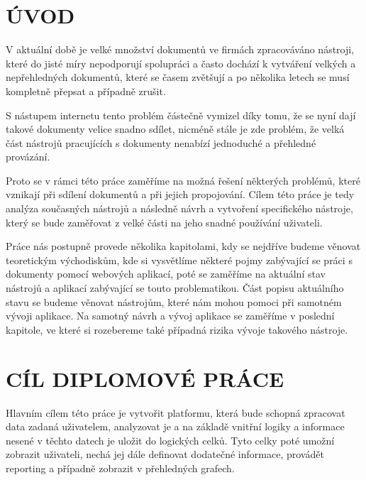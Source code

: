 \chapter*{ÚVOD}
\par V aktuální době je velké množství dokumentů ve firmách zpracováváno nástroji, které do jisté míry nepodporují spolupráci a často dochází k vytváření velkých a nepřehledných dokumentů, které se časem zvětšují a po několika letech se musí kompletně přepsat a případně zrušit.

\par S nástupem internetu tento problém částečně vymizel díky tomu, že se nyní dají takové dokumenty velice snadno sdílet, nicméně stále je zde problém, že velká část nástrojů pracujících s dokumenty nenabízí jednoduché a přehledné provázání.

\par Proto se v rámci této práce zaměříme na možná řešení některých problémů, které vznikají při sdílení dokumentů a při jejich propojování. Cílem této práce je tedy analýza současných nástrojů a následně návrh a vytvoření specifického nástroje, který se bude zaměřovat z velké části na jeho snadné používání uživateli.

\par Práce nás postupně provede několika kapitolami, kdy se nejdříve budeme věnovat teoretickým východiskům, kde si vysvětlíme některé pojmy zabývající se práci s dokumenty pomocí webových aplikací, poté se zaměříme na aktuální stav nástrojů a aplikací zabývající se touto problematikou. Část popisu aktuálního stavu se budeme věnovat nástrojům, které nám mohou pomoci při samotném vývoji aplikace. Na samotný návrh a vývoj aplikace se zaměříme v poslední kapitole, ve které si rozebereme také případná rizika vývoje takového nástroje.

\chapter*{CÍL DIPLOMOVÉ PRÁCE}
Hlavním cílem této práce je vytvořit platformu, která bude schopná zpracovat data zadaná uživatelem, analyzovat je a na základě vnitřní logiky a informace nesené v těchto datech je uložit do logických celků. Tyto celky poté umožní zobrazit uživateli, nechá jej dále definovat dodatečné informace, provádět reporting a případně zobrazit v přehledných grafech.


